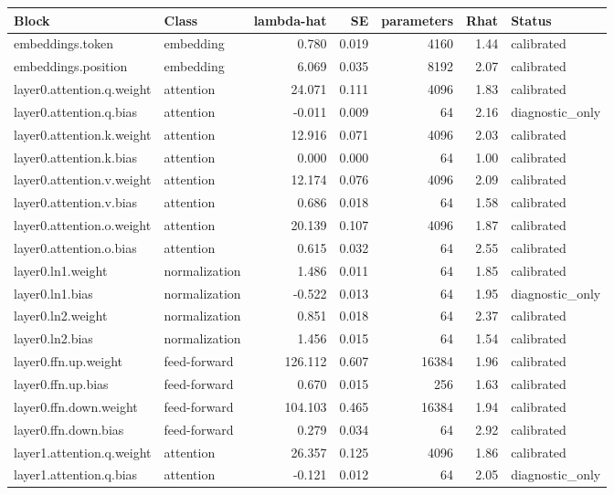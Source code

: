 \documentclass[11pt]{article}
\begin{document}
\small
\begin{longtable}{p{}p{}rrrrp{}}
\toprule
Block & Class & lambda-hat & SE & parameters & Rhat & Status \\
\midrule
\endhead
embeddings.token & embedding & 0.780 & 0.019 & 4160 & 1.44 & calibrated \\
embeddings.position & embedding & 6.069 & 0.035 & 8192 & 2.07 & calibrated \\
layer0.attention.q.weight & attention & 24.071 & 0.111 & 4096 & 1.83 & calibrated \\
layer0.attention.q.bias & attention & -0.011 & 0.009 & 64 & 2.16 & diagnostic\_only \\
layer0.attention.k.weight & attention & 12.916 & 0.071 & 4096 & 2.03 & calibrated \\
layer0.attention.k.bias & attention & 0.000 & 0.000 & 64 & 1.00 & calibrated \\
layer0.attention.v.weight & attention & 12.174 & 0.076 & 4096 & 2.09 & calibrated \\
layer0.attention.v.bias & attention & 0.686 & 0.018 & 64 & 1.58 & calibrated \\
layer0.attention.o.weight & attention & 20.139 & 0.107 & 4096 & 1.87 & calibrated \\
layer0.attention.o.bias & attention & 0.615 & 0.032 & 64 & 2.55 & calibrated \\
layer0.ln1.weight & normalization & 1.486 & 0.011 & 64 & 1.85 & calibrated \\
layer0.ln1.bias & normalization & -0.522 & 0.013 & 64 & 1.95 & diagnostic\_only \\
layer0.ln2.weight & normalization & 0.851 & 0.018 & 64 & 2.37 & calibrated \\
layer0.ln2.bias & normalization & 1.456 & 0.015 & 64 & 1.54 & calibrated \\
layer0.ffn.up.weight & feed-forward & 126.112 & 0.607 & 16384 & 1.96 & calibrated \\
layer0.ffn.up.bias & feed-forward & 0.670 & 0.015 & 256 & 1.63 & calibrated \\
layer0.ffn.down.weight & feed-forward & 104.103 & 0.465 & 16384 & 1.94 & calibrated \\
layer0.ffn.down.bias & feed-forward & 0.279 & 0.034 & 64 & 2.92 & calibrated \\
layer1.attention.q.weight & attention & 26.357 & 0.125 & 4096 & 1.86 & calibrated \\
layer1.attention.q.bias & attention & -0.121 & 0.012 & 64 & 2.05 & diagnostic\_only \\

\end{longtable}
\end{document}
